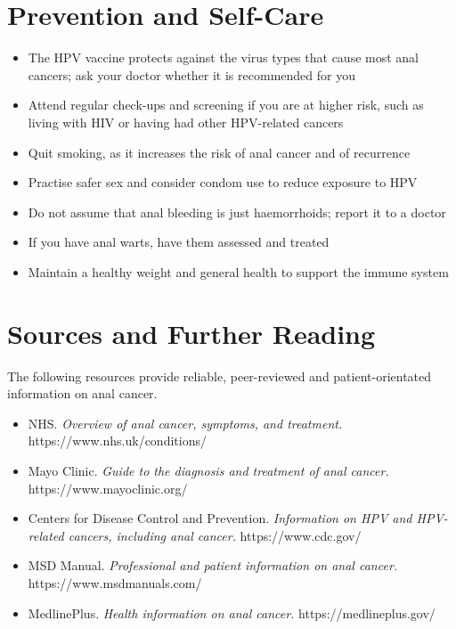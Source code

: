 \section*{Prevention and Self-Care}
\begin{itemize}
    \item The HPV vaccine protects against the virus types that cause most anal cancers; ask your doctor whether it is recommended for you
    \item Attend regular check-ups and screening if you are at higher risk, such as living with HIV or having had other HPV-related cancers
    \item Quit smoking, as it increases the risk of anal cancer and of recurrence
    \item Practise safer sex and consider condom use to reduce exposure to HPV
    \item Do not assume that anal bleeding is just haemorrhoids; report it to a doctor
    \item If you have anal warts, have them assessed and treated
    \item Maintain a healthy weight and general health to support the immune system
\end{itemize}

\section*{Sources and Further Reading}
The following resources provide reliable, peer-reviewed and patient-orientated information on anal cancer.

\begin{itemize}
    \item NHS. \textit{Overview of anal cancer, symptoms, and treatment.} https://www.nhs.uk/conditions/
    \item Mayo Clinic. \textit{Guide to the diagnosis and treatment of anal cancer.} https://www.mayoclinic.org/
    \item Centers for Disease Control and Prevention. \textit{Information on HPV and HPV-related cancers, including anal cancer.} https://www.cdc.gov/
    \item MSD Manual. \textit{Professional and patient information on anal cancer.} https://www.msdmanuals.com/
    \item MedlinePlus. \textit{Health information on anal cancer.} https://medlineplus.gov/
\end{itemize}
